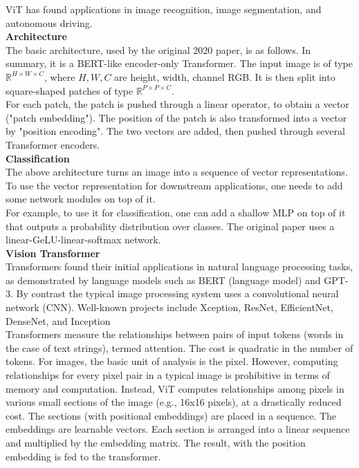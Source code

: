  ViT has found applications in image recognition, image segmentation, and autonomous driving.
\\

 \textbf{Architecture}\\
 The basic architecture, used by the original 2020 paper, is as follows. In summary, it is a BERT-like encoder-only Transformer.
The input image is of type \(\mathbb{R}^{H\times W \times C}\), where \(H, W, C\) are height, width, channel RGB. It is then split into square-shaped patches of type \(\mathbb{R}^{P\times P \times C}\). 
\\

For each patch, the patch is pushed through a linear operator, to obtain a vector ("patch embedding"). The position of the patch is also transformed into a vector by "position encoding". The two vectors are added, then pushed through several Transformer encoders.
\\

\textbf{Classification} \\
The above architecture turns an image into a sequence of vector representations. To use the vector representation for downstream applications, one needs to add some network modules on top of it.
\\

For example, to use it for classification, one can add a shallow MLP on top of it that outputs a probability distribution over classes. The original paper uses a linear-GeLU-linear-softmax network.
\\

\textbf{Vision Transformer}\\
Transformers found their initial applications in natural language processing tasks, as demonstrated by language models such as BERT (language model) and GPT-3. By contrast the typical image processing system uses a convolutional neural network (CNN). Well-known projects include Xception, ResNet, EfficientNet, DenseNet, and Inception
\\

Transformers measure the relationships between pairs of input tokens (words in the case of text strings), termed attention. The cost is quadratic in the number of tokens. For images, the basic unit of analysis is the pixel. However, computing relationships for every pixel pair in a typical image is prohibitive in terms of memory and computation. Instead, ViT computes relationships among pixels in various small sections of the image (e.g., 16x16 pixels), at a drastically reduced cost. The sections (with positional embeddings) are placed in a sequence. The embeddings are learnable vectors. Each section is arranged into a linear sequence and multiplied by the embedding matrix. The result, with the position embedding is fed to the transformer.
\\

